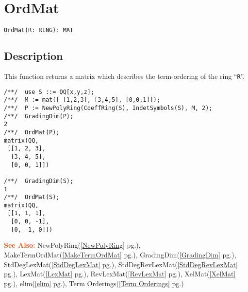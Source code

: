 \documentclass[a4paper]{mybook}
\newenvironment{command}{}{} %
\newcommand\SeeAlso{\par\textcolor{OrangeRed}{\textbf{\large See Also: }}}
\begin{document}
\section{OrdMat}
\label{OrdMat}
\begin{command} %


\begin{Verbatim}[label=syntax, rulecolor=\color{MidnightBlue},
frame=single]
OrdMat(R: RING): MAT
\end{Verbatim}


\subsection*{Description}

This function returns a matrix which describes the term-ordering
of the ring ``\verb&R&''.
\begin{Verbatim}[label=example, rulecolor=\color{PineGreen}, frame=single]
/**/  use S ::= QQ[x,y,z];
/**/  M := mat([ [1,2,3], [3,4,5], [0,0,1]]);
/**/  P := NewPolyRing(CoeffRing(S), IndetSymbols(S), M, 2);
/**/  GradingDim(P);
2
/**/  OrdMat(P);
matrix(QQ,
 [[1, 2, 3],
  [3, 4, 5],
  [0, 0, 1]])

/**/  GradingDim(S);
1
/**/  OrdMat(S);
matrix(QQ,
 [[1, 1, 1],
  [0, 0, -1],
  [0, -1, 0]])
\end{Verbatim}


\SeeAlso %
  NewPolyRing(\ref{NewPolyRing} pg.\pageref{NewPolyRing}), 
    MakeTermOrdMat(\ref{MakeTermOrdMat} pg.\pageref{MakeTermOrdMat}), 
    GradingDim(\ref{GradingDim} pg.\pageref{GradingDim}), 
    StdDegLexMat(\ref{StdDegLexMat} pg.\pageref{StdDegLexMat}), 
    StdDegRevLexMat(\ref{StdDegRevLexMat} pg.\pageref{StdDegRevLexMat}), 
    LexMat(\ref{LexMat} pg.\pageref{LexMat}), 
    RevLexMat(\ref{RevLexMat} pg.\pageref{RevLexMat}), 
    XelMat(\ref{XelMat} pg.\pageref{XelMat}), 
    elim(\ref{elim} pg.\pageref{elim}), 
    Term Orderings(\ref{Term Orderings} pg.\pageref{Term Orderings})
\end{command} %
\end{document}
